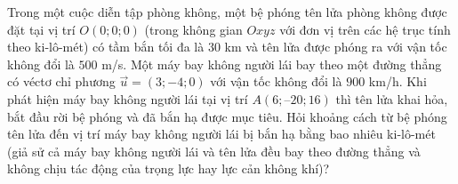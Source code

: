 \begin{bt}%
	Trong một cuộc diễn tập phòng không, một bệ phóng tên lửa phòng không được đặt tại vị trí $O(0;0;0)$ (trong không gian $Oxyz$ với đơn vị trên các hệ trục tính theo ki-lô-mét) có tầm bắn tối đa là $30$ km và tên lửa được phóng ra với vận tốc không đổi là $500$ m/s. Một máy bay không người lái bay theo một đường thẳng có véctơ chỉ phương $\overrightarrow{u}=\left(3;-4;0  \right) $ với vận tốc không đổi là $900$ km/h. Khi phát hiện máy bay không người lái tại vị trí $A(6;–20;16)$ thì tên lửa khai hỏa, bắt đầu rời bệ phóng và đã bắn hạ được mục tiêu. Hỏi khoảng cách từ bệ phóng tên lửa đến vị trí máy bay không người lái bị bắn hạ bằng bao nhiêu ki-lô-mét (giả sử cả máy bay không người lái và tên lửa đều bay theo đường thẳng và không chịu tác động của trọng lực hay lực cản không khí)?
\end{bt}
